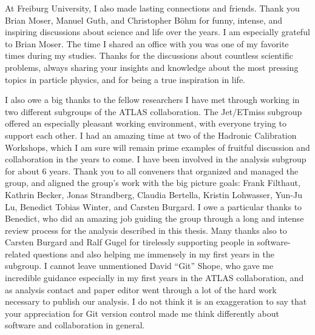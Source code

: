 At Freiburg University, I also made lasting connections and friends. Thank you Brian Moser, Manuel Guth, and Christopher Böhm for funny, intense, and inspiring discussions about science and life over the years.
I am especially grateful to Brian Moser. The time I shared an office with you was one of my favorite times during my studies. Thanks for the discussions about countless scientific problems, always sharing your insights and knowledge about the most pressing topics in particle physics, and for being a true inspiration in life.

I also owe a big thanks to the fellow researchers I have met through working in two different subgroups of the ATLAS collaboration. 
The Jet/ETmiss subgroup offered an especially pleasant working environment, with everyone trying to support each other. I had an amazing time at two of the Hadronic Calibration Workshops, which I am sure will remain prime examples of fruitful discussion and collaboration in the years to come. 
I have been involved in the \HWW analysis subgroup for about 6 years.
Thank you to all conveners that organized and managed the group, and aligned the group's work with the big picture goals: Frank Filthaut, Kathrin Becker, Jonas Strandberg, Claudia Bertella, Kristin Lohwasser, Yun-Ju Lu, Benedict Tobias Winter, and Carsten Burgard. 
I owe a particular thanks to Benedict, who did an amazing job guiding the group through a long and intense review process for the analysis described in this thesis. 
Many thanks also to Carsten Burgard and Ralf Gugel for tirelessly supporting people in software-related questions and also helping me immensely in my first years in the \HWW subgroup. 
I cannot leave unmentioned David ``Git'' Shope, who gave me incredible guidance especially in my first years in the ATLAS collaboration, and as analysis contact and paper editor went through a lot of the hard work necessary to publish our analysis. I do not think it is an exaggeration to say that your appreciation for Git version control made me think differently about software and collaboration in general. 

